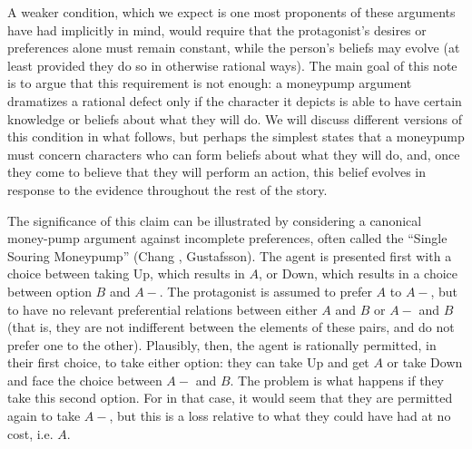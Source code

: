\documentclass[11pt]{article}
\theoremstyle{definition}
\theoremstyle{definition}
\begin{document}
A weaker condition, which we expect is one most proponents of these arguments have had implicitly in mind, would require that the protagonist's desires or preferences alone must remain constant, while the person's beliefs may evolve (at least provided they do so in otherwise rational ways). The main goal of this note is to argue that this requirement is not enough: a moneypump argument dramatizes a rational defect only if the character it depicts is able to have certain knowledge or beliefs about what they will do. We will discuss different versions of this condition in what follows, but perhaps the simplest states that a moneypump must concern characters who can form beliefs about what they will do, and, once they come to believe that they will perform an action, this belief evolves in response to the evidence throughout the rest of the story. 

The significance of this claim can be illustrated by considering a canonical money-pump argument against incomplete preferences, often called the ``Single Souring Moneypump'' (Chang%
, Gustafsson). The agent is presented first with a choice between taking Up, which results in $A$, or Down, which results in a choice between option $B$ and $A-$. The protagonist is assumed to prefer $A$ to $A-$, but to have no relevant preferential relations between either $A$ and $B$ or $A-$ and $B$ (that is, they are not indifferent between the elements of these pairs, and do not prefer one to the other). Plausibly, then, the agent is rationally permitted, in their first choice, to take either option: they can take Up and get $A$ or take Down and face the choice between $A-$ and $B$. The problem is what happens if they take this second option. For in that case, it would seem that they are permitted again to take $A-$, but this is a loss relative to what they could have had at no cost, i.e. $A$.
\end{document}
